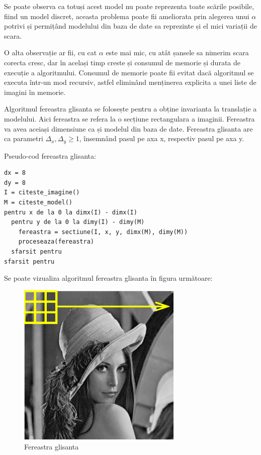 Se poate observa ca totuși acest model nu poate reprezenta toate scările posibile, fiind un model discret, aceasta problema poate fii ameliorata prin alegerea unui ${\alpha}$ potrivi și permițând modelului din baza de date sa reprezinte și el mici variații de scara.

O alta observație ar fii, cu cat ${\alpha}$ este mai mic, cu atât șansele sa nimerim scara corecta cresc, dar în același timp creste și consumul de memorie și durata de execuție a algoritmului. Consumul de memorie poate fii evitat dacă algoritmul se executa într-un mod recursiv, astfel eliminând menținerea explicita a unei liste de imagini în memorie.

Algoritmul fereastra glisanta se folosește pentru a obține invarianta la translație a modelului.
Aici fereastra se refera la o secțiune rectangulara a imaginii.
Fereastra va avea aceiași dimensiune ca și modelul din baza de date.
Fereastra glisanta are ca parametri ${\Delta_x, \Delta_y \geq 1}$, însemnând pasul pe axa x, respectiv pasul pe axa y.

Pseudo-cod fereastra glisanta:
\begin{mdframed}
\begin{verbatim}
dx = 8
dy = 8
I = citeste_imagine()
M = citeste_model()
pentru x de la 0 la dimx(I) - dimx(I)
  pentru y de la 0 la dimy(I) - dimy(M)
    fereastra = sectiune(I, x, y, dimx(M), dimy(M))
    proceseaza(fereastra)
  sfarsit pentru
sfarsit pentru
\end{verbatim}
\end{mdframed}

Se poate vizualiza algoritmul fereastra glisanta în figura următoare:
\begin{figure}[H]
	\centering
		\includegraphics[width=0.70\textwidth]{imagini/AGhannoum-SlidingWindow.png}
	\caption{Fereastra glisanta}
	\label{fig:AGhannoum-SlidingWindow}
\end{figure}


